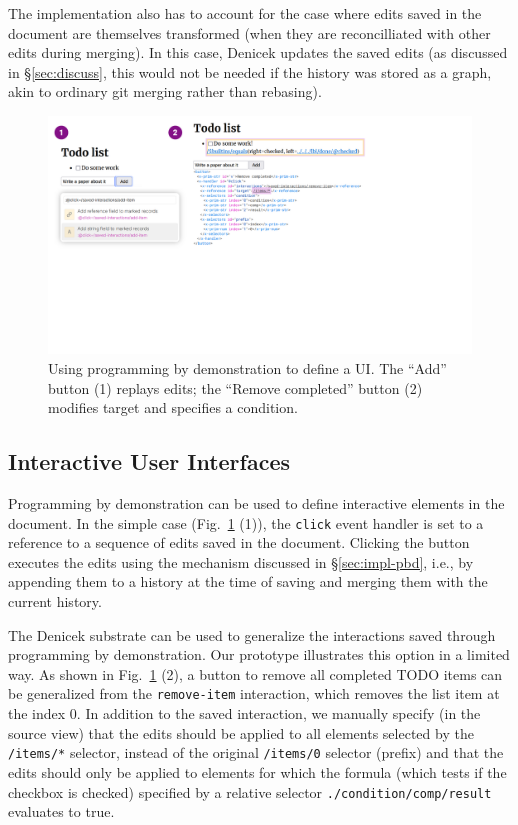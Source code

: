 \documentclass[sigconf]{acmart}
\begin{document}
The implementation also has to account for the case where edits saved in the document are themselves
transformed (when they are reconcilliated with other edits during merging). In this case, Denicek
updates the saved edits (as discussed in \S\ref{sec:discuss}, this would not be needed if the
history was stored as a graph, akin to ordinary git merging rather than rebasing).

\begin{figure}[t]
\includegraphics[width=1\columnwidth,clip,trim=0.5cm 8.5cm 8.5cm 0.5cm]{fig/interactive.pdf}
\vspace{-1em}
\caption{Using programming by demonstration to define a UI. The ``Add'' button (1) replays edits;
the ``Remove completed'' button (2) modifies target and specifies a condition. }
\label{fig:interactive}
\vspace{-0.5em}
\end{figure}

\subsection{Interactive User Interfaces}
\label{sec:impl-interaction}

Programming by demonstration can be used to define interactive elements in the document. In the
simple case (Fig.~\ref{fig:interactive} (1)), the {\small\Verb_click_} event handler is set to a
reference to a sequence of edits saved in the document. Clicking the button executes the edits
using the mechanism discussed in \S\ref{sec:impl-pbd}, i.e., by appending them to a history at the
time of saving and merging them with the current history.

The Denicek substrate can be used to generalize the interactions saved through programming by
demonstration. Our prototype illustrates this option in a limited way. As shown in
Fig.~\ref{fig:interactive} (2), a button to remove all completed TODO items can be generalized
from the {\small\Verb_remove-item_} interaction, which removes the list item at the index 0.
In addition to the saved interaction, we manually specify (in the source view) that the edits
should be applied to all elements selected by the {\small\Verb_/items/*_} selector, instead of
the original {\small\Verb_/items/0_} selector (prefix) and that the edits should only be
applied to elements for which the formula (which tests if the checkbox is checked) specified by a
relative selector {\small\Verb_./condition/comp/result_} evaluates to true.
\end{document}
